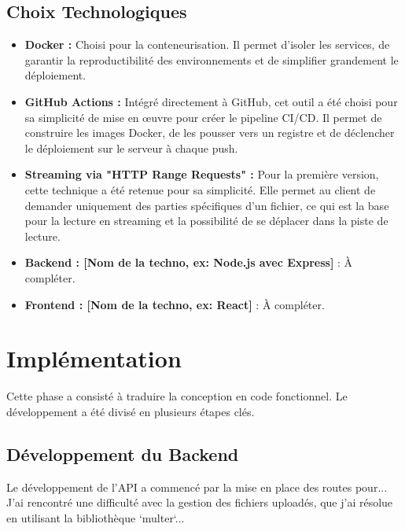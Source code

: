 \documentclass[12pt,a4paper]{article} %
\begin{document}
\subsection{Choix Technologiques}
\begin{itemize}
    \item \textbf{Docker :} Choisi pour la conteneurisation. Il permet d'isoler les services, de garantir la reproductibilité des environnements et de simplifier grandement le déploiement.
    \item \textbf{GitHub Actions :} Intégré directement à GitHub, cet outil a été choisi pour sa simplicité de mise en œuvre pour créer le pipeline CI/CD. Il permet de construire les images Docker, de les pousser vers un registre et de déclencher le déploiement sur le serveur à chaque push.
    \item \textbf{Streaming via "HTTP Range Requests" :} Pour la première version, cette technique a été retenue pour sa simplicité. Elle permet au client de demander uniquement des parties spécifiques d'un fichier, ce qui est la base pour la lecture en streaming et la possibilité de se déplacer dans la piste de lecture.
    \item \textbf{Backend : [Nom de la techno, ex: Node.js avec Express]} : À compléter.
    \item \textbf{Frontend : [Nom de la techno, ex: React]} : À compléter.
\end{itemize}

\section{Implémentation}
Cette phase a consisté à traduire la conception en code fonctionnel. Le développement a été divisé en plusieurs étapes clés.

\subsection{Développement du Backend}
Le développement de l'API a commencé par la mise en place des routes pour... J'ai rencontré une difficulté avec la gestion des fichiers uploadés, que j'ai résolue en utilisant la bibliothèque `multer`...
\end{document}

